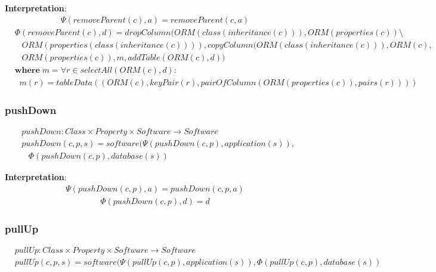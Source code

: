 \documentclass[10pt]{article}
\begin{document}
\noindent \textbf{Interpretation}:
\begin{align}
\Psi(removeParent(c), a) = removeParent(c, a)
\end{align}
\begin{align}
&\Phi(removeParent(c), d) = 
 dropColumn(ORM(class(inheritance(c))), ORM(properties(c)) \setminus \nonumber \\ 
& \;\;\; ORM(properties(class(inheritance(c)))), copyColumn(ORM(class(inheritance(c))), ORM(c), \nonumber \\ 
& \;\;\; ORM(properties(c)), m, 
addTable(ORM(c), d)) \nonumber \\
& \mathbf{where} \; m = \forall r \in selectAll(ORM(c), d) : \nonumber \\  
& \;\; m(r) = tableData((ORM(c), keyPair(r), pairOfColumn(ORM(properties(c)), pairs(r))))  
\end{align}

\subsubsection{pushDown}
\begin{align}
& pushDown: Class \times Property \times Software \rightarrow Software \nonumber \\
& pushDown(c, p, s) = software(\Psi(pushDown(c, p), application(s)), \nonumber \\
& \;\;\; \Phi(pushDown(c, p), database(s))
\end{align}

\noindent \textbf{Interpretation}:
\begin{align}
\Psi(pushDown(c, p), a) = pushDown(c, p, a)
\end{align}
\begin{align}
\Phi(pushDown(c, p), d) = d
\end{align}

\subsubsection{pullUp}
\begin{align}
& pullUp: Class \times Property \times Software \rightarrow Software \nonumber \\
& pullUp(c, p, s) = software(\Psi(pullUp(c, p), application(s)), \Phi(pullUp(c, p), database(s))
\end{align}
\end{document}
